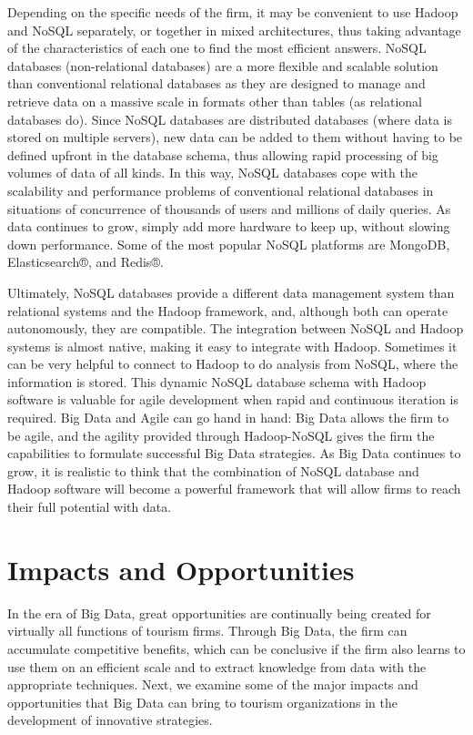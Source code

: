 \documentclass[
  letterpaper,
  DIV=11,
  numbers=noendperiod]{scrreprt}
\begin{document}
Depending on the specific needs of the firm, it may be convenient to use
Hadoop and NoSQL separately, or together in mixed architectures, thus
taking advantage of the characteristics of each one to find the most
efficient answers. NoSQL databases (non-relational databases) are a more
flexible and scalable solution than conventional relational databases as
they are designed to manage and retrieve data on a massive scale in
formats other than tables (as relational databases do). Since NoSQL
databases are distributed databases (where data is stored on multiple
servers), new data can be added to them without having to be defined
upfront in the database schema, thus allowing rapid processing of big
volumes of data of all kinds. In this way, NoSQL databases cope with the
scalability and performance problems of conventional relational
databases in situations of concurrence of thousands of users and
millions of daily queries. As data continues to grow, simply add more
hardware to keep up, without slowing down performance. Some of the most
popular NoSQL platforms are MongoDB, Elasticsearch®, and Redis®.

Ultimately, NoSQL databases provide a different data management system
than relational systems and the Hadoop framework, and, although both can
operate autonomously, they are compatible. The integration between NoSQL
and Hadoop systems is almost native, making it easy to integrate with
Hadoop. Sometimes it can be very helpful to connect to Hadoop to do
analysis from NoSQL, where the information is stored. This dynamic NoSQL
database schema with Hadoop software is valuable for agile development
when rapid and continuous iteration is required. Big Data and Agile can
go hand in hand: Big Data allows the firm to be agile, and the agility
provided through Hadoop-NoSQL gives the firm the capabilities to
formulate successful Big Data strategies. As Big Data continues to grow,
it is realistic to think that the combination of NoSQL database and
Hadoop software will become a powerful framework that will allow firms
to reach their full potential with data.

\hypertarget{impacts-and-opportunities}{%
\section{Impacts and Opportunities}\label{impacts-and-opportunities}}

In the era of Big Data, great opportunities are continually being
created for virtually all functions of tourism firms. Through Big Data,
the firm can accumulate competitive benefits, which can be conclusive if
the firm also learns to use them on an efficient scale and to extract
knowledge from data with the appropriate techniques. Next, we examine
some of the major impacts and opportunities that Big Data can bring to
tourism organizations in the development of innovative strategies.
\end{document}
